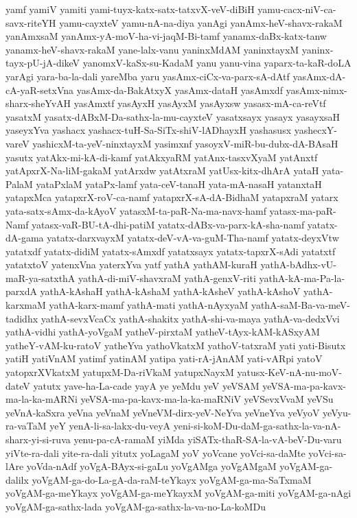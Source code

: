 {yamf
yamiV
yamiti
yami-tuyx-katx-satx-tatxvX-veV-diBiH
yamu-cacx-niV-ca-savx-riteYH
yamu-cayxteV
yamu-nA-na-diya
yanAgi
yanAmx-heV-shavx-rakaM
yanAmxsaM
yanAmx-yA-moV-ha-vi-jaqM-Bi-tamf
yanamx-daBx-katx-tanw
yanamx-heV-shavx-rakaM
yane-lalx-vanu
yaninxMdAM
yaninxtayxM
yaninx-tayx-pU-jA-dikeV
yanomxV-kaSx-su-KadaM
yanu
yanu-vina
yaparx-ta-kaR-doLA
yarAgi
yara-ba-la-dali
yareMba
yaru
yasAmx-ciCx-va-parx-sA-dAtf
yasAmx-dA-cA-yaR-setxVna
yasAmx-da-BakAtxyX
yasAmx-dataH
yasAmxdf
yasAmx-nimx-sharx-sheYvAH
yasAmxtf
yasAyxH
yasAyxM
yasAyxsw
yasasx-mA-ca-reVtf
yasatxM
yasatx-dABxM-Da-sathx-la-mu-cayxteV
yasatxsayx
yasayx
yasayxsaH
yaseyxYva
yashacx
yashacx-tuH-Sa-SiTx-shiV-lADhayxH
yashasusx
yashecxY-vareV
yashicxM-ta-yeV-ninxtayxM
yasimxnf
yasoyxV-miR-bu-dubx-dA-BAsaH
yasutx
yatAkx-mi-kA-di-kamf
yatAkxyaRM
yatAnx-tasxvXyaM
yatAnxtf
yatApxrX-Na-liM-gakaM
yatArxdw
yatAtxraM
yatUsx-kitx-dhArA
yataH
yata-PalaM
yataPxlaM
yataPx-lamf
yata-ceV-tanaH
yata-mA-nasaH
yatanxtaH
yatapxMca
yatapxrX-roV-ca-namf
yatapxrX-sA-dA-BidhaM
yatapxraM
yatarx
yata-satx-sAmx-da-kAyoV
yatasxM-ta-paR-Na-ma-navx-hamf
yatasx-ma-paR-Namf
yatasx-vaR-BU-tA-dhi-patiM
yatatx-dABx-va-parx-kA-sha-namf
yatatx-dA-gama
yatatx-darxvayxM
yatatx-deV-vA-va-guM-Tha-namf
yatatx-deyxVtw
yatatxdf
yatatx-didiM
yatatx-sAmxdf
yatatxsayx
yatatx-tapxrX-sAdi
yatatxtf
yatatxtoV
yatenxVna
yaterxYva
yatf
yathA
yathAM-kuraH
yathA-bAdhx-vU-maR-ya-satxthA
yathA-di-miV-shavxraM
yathA-genxV-riti
yathA-kA-ma-Pa-la-parxdA
yathA-kAshaH
yathA-kAshaM
yathA-kAsheV
yathA-kAshoV
yathA-karxmaM
yathA-karx-mamf
yathA-mati
yathA-nAyxyaM
yathA-saM-Ba-va-meV-tadidhx
yathA-sevxVcaCx
yathA-shakitx
yathA-shi-va-maya
yathA-va-dedxVvi
yathA-vidhi
yathA-yoVgaM
yatheV-pirxtaM
yatheV-tAyx-kAM-kASxyAM
yatheY-vAM-ku-ratoV
yatheYva
yathoVkatxM
yathoV-tatxraM
yati
yati-Bisutx
yatiH
yatiVnAM
yatimf
yatinAM
yatipa
yati-rA-jAnAM
yati-vARpi
yatoV
yatopxrXVkatxM
yatupxM-Da-riVkaM
yatupxNayxM
yatusx-KeV-nA-nu-moV-dateV
yatutx
yave-ha-La-cade
yayA
ye
yeMdu
yeV
yeVSAM
yeVSA-ma-pa-kavx-ma-la-ka-mARNi
yeVSA-ma-pa-kavx-ma-la-ka-maRNiV
yeVSevxVvaM
yeVSu
yeVnA-kaSxra
yeVna
yeVnaM
yeVneVM-dirx-yeV-NeYva
yeVneYva
yeVyoV
yeVyu-ra-vaTaM
yeY
yenA-li-sa-lakx-du-veyA
yeni-si-koM-Du-daM-ga-sathx-la-va-nA-sharx-yi-si-ruva
yenu-pa-cA-ramaM
yiMda
yiSATx-thaR-SA-la-vA-beV-Du-varu
yiVte-ra-dali
yite-ra-dali
yitutx
yoLagaM
yoV
yoVcane
yoVci-sa-daMte
yoVci-sa-lAre
yoVda-nAdf
yoVgA-BAyx-si-gaLu
yoVgAMga
yoVgAMgaM
yoVgAM-ga-dalilx
yoVgAM-ga-do-La-gA-da-raM-teYkayx
yoVgAM-ga-ma-SaTxmaM
yoVgAM-ga-meYkayx
yoVgAM-ga-meYkayxM
yoVgAM-ga-miti
yoVgAM-ga-nAgi
yoVgAM-ga-sathx-lada
yoVgAM-ga-sathx-la-va-no-La-koMDu
}
